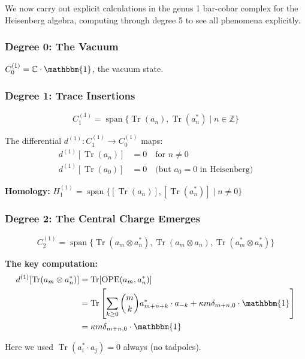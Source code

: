 We now carry out explicit calculations in the genus 1 bar-cobar complex for the
Heisenberg algebra, computing through degree 5 to see all phenomena explicitly.

\subsubsection{Degree 0: The Vacuum}

$C_0^{(1)} = \mathbb{C} \cdot \mathbbm{1}$, the vacuum state.

\subsubsection{Degree 1: Trace Insertions}

$$C_1^{(1)} = \operatorname{span}\{ \operatorname{Tr}(a_n), \operatorname{Tr}(a^*_n) \mid n \in \mathbb{Z} \}$$

The differential $d^{(1)}: C_1^{(1)} \to C_0^{(1)}$ maps:
\begin{align}
d^{(1)}[\operatorname{Tr}(a_n)] &= 0 \quad \text{for } n \neq 0 \\
d^{(1)}[\operatorname{Tr}(a_0)] &= 0 \quad \text{(but $a_0 = 0$ in Heisenberg)}
\end{align}

\textbf{Homology:} $H_1^{(1)} = \operatorname{span}\{ [\operatorname{Tr}(a_n)], [\operatorname{Tr}(a^*_n)] \mid n \neq 0 \}$

\subsubsection{Degree 2: The Central Charge Emerges}

$$C_2^{(1)} = \operatorname{span}\{ 
\operatorname{Tr}(a_m \otimes a^*_n), 
\operatorname{Tr}(a_m \otimes a_n), 
\operatorname{Tr}(a^*_m \otimes a^*_n) 
\}$$

\textbf{The key computation:}
\begin{align}
d^{(1)}[\operatorname{Tr}(a_m \otimes a^*_n)] 
&= \operatorname{Tr}[\text{OPE}(a_m, a^*_n)] \\
&= \operatorname{Tr}\left[ \sum_{k \geq 0} \binom{m}{k} a^*_{m+n+k} \cdot a_{-k} 
+ \kappa m \delta_{m+n,0} \cdot \mathbbm{1} \right] \\
&= \kappa m \delta_{m+n,0} \cdot \mathbbm{1}
\end{align}

Here we used $\operatorname{Tr}(a^*_i \cdot a_j) = 0$ always (no tadpoles).

